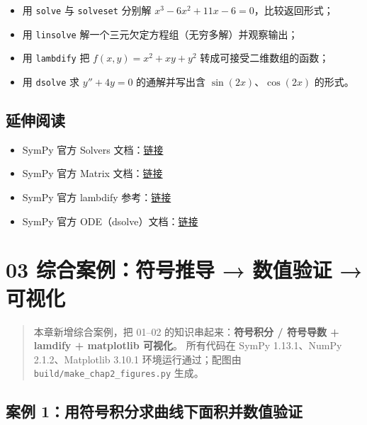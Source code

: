 \begin{itemize}
\tightlist
\item
  用 \texttt{solve} 与 \texttt{solveset} 分别解
  \(x^3-6x^2+11x-6=0\)，比较返回形式；
\item
  用 \texttt{linsolve} 解一个三元欠定方程组（无穷多解）并观察输出；
\item
  用 \texttt{lambdify} 把 \(f(x,y)=x^2+xy+y^2\)
  转成可接受二维数组的函数；
\item
  用 \texttt{dsolve} 求 \(y''+4y=0\) 的通解并写出含
  \(\sin(2x)\)、\(\cos(2x)\) 的形式。
\end{itemize}

\subsection{延伸阅读}\label{ux5ef6ux4f38ux9605ux8bfb-7}

\begin{itemize}
\tightlist
\item
  SymPy 官方 Solvers
  文档：\href{https://docs.sympy.org/latest/modules/solvers/index.html}{链接}
\item
  SymPy 官方 Matrix
  文档：\href{https://docs.sympy.org/latest/modules/matrices/index.html}{链接}
\item
  SymPy 官方 lambdify
  参考：\href{https://docs.sympy.org/latest/modules/utilities/lambdify.html}{链接}
\item
  SymPy 官方
  ODE（dsolve）文档：\href{https://docs.sympy.org/latest/modules/solvers/ode.html}{链接}
\end{itemize}

\section{03 综合案例：符号推导 → 数值验证 →
可视化}\label{ux7efcux5408ux6848ux4f8bux7b26ux53f7ux63a8ux5bfc-ux6570ux503cux9a8cux8bc1-ux53efux89c6ux5316}

\begin{quote}
本章新增综合案例，把 01--02 的知识串起来：\textbf{符号积分 / 符号导数 +
lamdify + matplotlib 可视化}。 所有代码在 SymPy 1.13.1、NumPy
2.1.2、Matplotlib 3.10.1 环境运行通过；配图由
\texttt{build/make\_chap2\_figures.py} 生成。
\end{quote}

\subsection{案例
1：用符号积分求曲线下面积并数值验证}\label{ux6848ux4f8b-1ux7528ux7b26ux53f7ux79efux5206ux6c42ux66f2ux7ebfux4e0bux9762ux79efux5e76ux6570ux503cux9a8cux8bc1}

